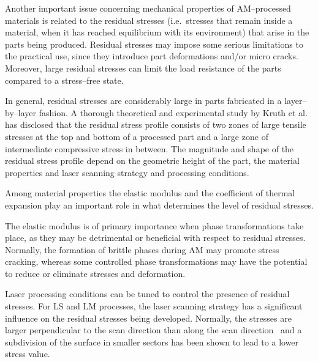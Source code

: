 Another important issue concerning mechanical properties of AM--processed materials is related to the residual stresses (i.e.\ stresses that remain inside a material, when it has reached equilibrium with its environment) that arise in the parts being produced. Residual stresses may impose some serious limitations to the practical use, since they introduce part deformations and/or micro cracks. Moreover, large residual stresses can limit the load resistance of the parts compared to a stress--free state.

In general, residual stresses are considerably large in parts fabricated in a layer--by--layer fashion. A thorough theoretical and experimental study by Kruth et al.~\cite{kruth+04jmatproctech} has disclosed that the residual stress profile consists of two zones of large tensile stresses at the top and bottom of a processed part and a large zone of intermediate compressive stress in between. The magnitude and shape of the residual stress profile depend on the geometric height of the part, the material properties and laser scanning strategy and processing conditions.

Among material properties the elastic modulus and the coefficient of thermal expansion play an important role in what determines the level of residual stresses.


The elastic modulus is of primary importance when phase transformations take place, as they may be detrimental or beneficial with respect to residual stresses. Normally, the formation of brittle phases during AM may promote stress cracking, whereas some controlled phase transformations may have the potential to reduce or eliminate stresses and deformation.

Laser processing conditions can be tuned to control the presence of residual stresses. For LS and LM processes, the laser scanning strategy has a significant influence on the residual stresses being developed. Normally, the stresses are larger perpendicular to the scan direction than along the scan direction~\cite{Simchi2003:GuREVIEW173}  and a  subdivision of the surface in smaller sectors has been shown to lead to a lower stress value.


